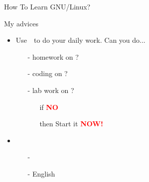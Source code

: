 \begin{frame}{How To Learn GNU/Linux?}
  \begin{block}{My advices}
    \begin{itemize}
    \item Use \,{\linux}\, to do your daily work. Can you do...
      \begin{itemize}
      \item[-] homework on \linux\;?
      \item[-] coding on \linux\;?
      \item[-] lab work on \linux\;?
        \begin{itemize}
        \item[if] \textbf{\textcolor{Red}{\purisa NO}}
        \item[then] Start it \textbf{\textcolor{Red}{\purisa NOW!}}
        \end{itemize}
      \end{itemize}
    \item {\nerd } \globe
      \begin{itemize}
      \item[-] \google
      \item[-] {\purisa English}
      \end{itemize}
    \end{itemize}
  \end{block}
\end{frame}

